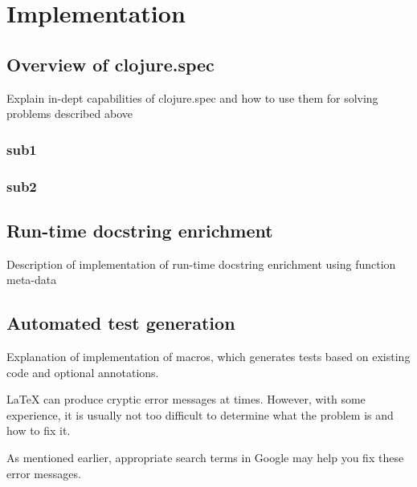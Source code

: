 \chapter{Implementation}
\label{chap:implementation}

\section{Overview of clojure.spec}
Explain in-dept capabilities of clojure.spec and how to use them for solving
problems described above
\subsection{sub1}
\subsection{sub2}

\section{Run-time docstring enrichment}
Description of implementation of run-time docstring enrichment using function
meta-data

\section{Automated test generation}
Explanation of implementation of macros, which generates tests based on existing
code and optional annotations.

\LaTeX{} can produce cryptic error messages at times.
However, with some experience, it is usually not too
difficult to determine what the problem is and how to fix it.

As mentioned earlier, appropriate search terms in Google
may help you fix these error messages.

